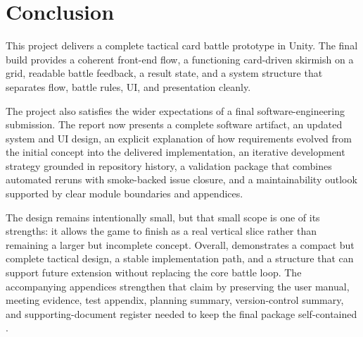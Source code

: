 \chapter{Conclusion}

This project delivers a complete tactical card battle prototype in Unity. The final build provides a coherent front-end flow, a functioning card-driven skirmish on a grid, readable battle feedback, a result state, and a system structure that separates flow, battle rules, UI, and presentation cleanly.

The project also satisfies the wider expectations of a final software-engineering submission. The report now presents a complete software artifact, an updated system and UI design, an explicit explanation of how requirements evolved from the initial concept into the delivered implementation, an iterative development strategy grounded in repository history, a validation package that combines automated reruns with smoke-backed issue closure, and a maintainability outlook supported by clear module boundaries and appendices.

The design remains intentionally small, but that small scope is one of its strengths: it allows the game to finish as a real vertical slice rather than remaining a larger but incomplete concept. Overall, \projectname{} demonstrates a compact but complete tactical design, a stable implementation path, and a structure that can support future extension without replacing the core battle loop. The accompanying appendices strengthen that claim by preserving the user manual, meeting evidence, test appendix, planning summary, version-control summary, and supporting-document register needed to keep the final package self-contained \cite{courseSpecification}.
